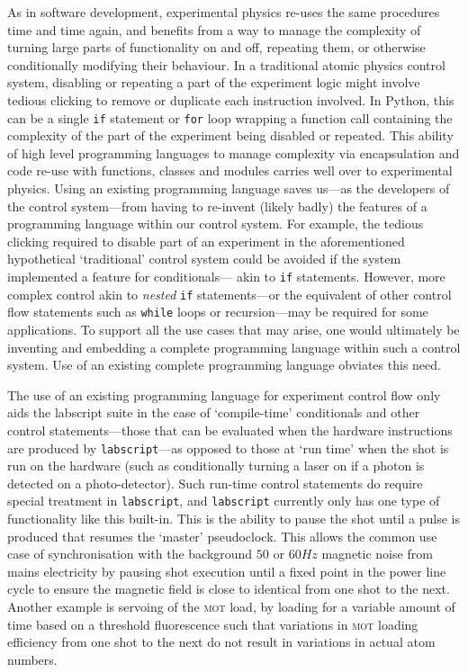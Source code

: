 As in software development, experimental physics re-uses the same procedures time and time again, and benefits from a way to manage the complexity of turning large parts of functionality on and off, repeating them, or otherwise conditionally modifying their behaviour. In a traditional atomic physics control system, disabling or repeating a part of the experiment logic might involve tedious clicking to remove or duplicate each instruction involved. In Python, this can be a single \texttt{if} statement or \texttt{for} loop wrapping a function call containing the complexity of the part of the experiment being disabled or repeated. This ability of high level programming languages to manage complexity via encapsulation and code re-use with functions, classes and modules carries well over to experimental physics. Using an existing programming language saves us---as the developers of the control system---from having to re-invent (likely badly) the features of a programming language within our control system. For example, the tedious clicking required to disable part of an experiment in the aforementioned hypothetical `traditional' control system could be avoided if the system implemented a feature for conditionals--- akin to \texttt{if} statements. However, more complex control akin to \emph{nested} \texttt{if} statements---or the equivalent of other control flow statements such as \texttt{while} loops or recursion---may be required for some applications. To support all the use cases that may arise, one would ultimately be inventing and embedding a complete programming language within such a control system. Use of an existing complete programming language obviates this need.

The use of an existing programming language for experiment control flow only aids the labscript suite in the case of `compile-time' conditionals and other control statements---those that can be evaluated when the hardware instructions are produced by \texttt{labscript}---as opposed to those at `run time' when the shot is run on the hardware (such as conditionally turning a laser on if a photon is detected on a photo-detector). Such run-time control statements do require special treatment in \texttt{labscript}, and \texttt{labscript} currently only has one type of functionality like this built-in. This is the ability to pause the shot until a pulse is produced that resumes the `master' pseudoclock. This allows the common use case of synchronisation with the background $50$ or $60\unit{Hz}$ magnetic noise from mains electricity by pausing shot execution until a fixed point in the power line cycle to ensure the magnetic field is close to identical from one shot to the next. Another example is servoing of the \textsc{mot} load, by loading for a variable amount of time based on a threshold fluorescence such that variations in \textsc{mot} loading efficiency from one shot to the next do not result in variations in actual atom numbers.

